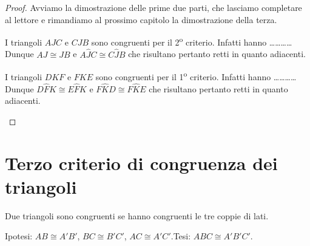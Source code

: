\begin{proof}
Avviamo la dimostrazione delle prime due parti, che lasciamo completare al lettore e rimandiamo al prossimo capitolo la dimostrazione della terza.

\begin{enumeratea}
\item I triangoli $AJC$ e $CJB$ sono congruenti per il 2\textsuperscript{o} criterio. Infatti hanno \ldots\ldots\ldots\ldots{}\\
Dunque $AJ\cong JB$ e $A\widehat{J}C\cong C\widehat{J}B$ che risultano pertanto retti in quanto adiacenti.  
\item I triangoli $DKF$ e $FKE$ sono congruenti per il 1\textsuperscript{o} criterio. Infatti hanno \ldots\ldots\ldots\ldots{}\\
Dunque $D\widehat{F}K\cong E\widehat{F}K$ e $F\widehat{K}D\cong F\widehat{K}E$ che risultano pertanto retti in quanto adiacenti.
\end{enumeratea}
\end{proof}

\section{Terzo criterio di congruenza dei triangoli}

\begin{teorema}
Due triangoli sono congruenti se hanno congruenti le tre coppie di lati.
\end{teorema}

\begin{figure}[htb]
\centering
\end{figure}

\noindent Ipotesi: $AB\cong A'B'$, $BC\cong B'C'$, $AC\cong A'C'$.\tab Tesi: $ABC\cong A'B'C'$.

\begin{figure}[htb]
\centering
\end{figure}

